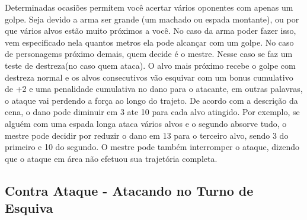 Determinadas ocasiões permitem você acertar vários oponentes com apenas um golpe. Seja devido a arma ser grande (um machado ou espada montante), ou por que vários alvos estão muito próximos a você. No caso da arma poder fazer isso, vem especificado nela quantos metros ela pode alcançar com um golpe. No caso de personagems próximo demais, quem decide é o mestre. Nesse caso se faz um teste de destreza(no caso quem ataca). O alvo mais próximo recebe o golpe com destreza normal e os alvos consecutivos vão esquivar com um bonus cumulativo de +2 e uma penalidade cumulativa no dano para o atacante, em outras palavras, o ataque vai perdendo a força ao longo do trajeto. De acordo com a descrição da cena, o dano pode diminuir em 3 ate 10 para cada alvo atingido. Por exemplo, se alguém com uma espada longa ataca vários alvos e o segundo absorve tudo, o mestre pode decidir por reduzir o dano em 13 para o terceiro alvo, sendo 3 do primeiro e 10 do segundo. O mestre pode também interromper o ataque, dizendo que o ataque em área não efetuou sua trajetória completa. 

\subsection{Contra Ataque - Atacando no Turno de Esquiva}

